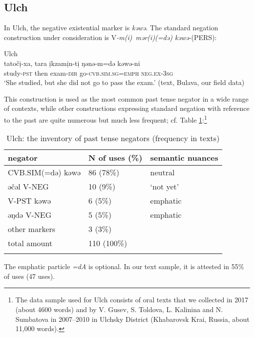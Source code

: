 \documentclass[output=paper]{langscibook}
\begin{document}
\subsection{Ulch}\label{sec:T5.4}

In Ulch, the negative existential marker is \textit{kəwə}. The standard negation construction under consideration is V\textit{-m(i)~mər(i)(=də) kəwə-}(PERS):

\ea Ulch \label{ex:T16}\\
	\gll tatočị-xa,	tara	ịkzamịn-tị	ŋənə-m=də	kəwə-ni\\
	study-\textsc{pst}	then	exam-\textsc{dir}	go-\textsc{cvb.sim.sg=emph}	\textsc{neg.ex-3sg}\\
	\glt `She studied, but she did not go to pass the exam.' (text, Bulava, our field data)
\z

This construction is used as the most common past tense negator in a wide range of contexts, while other constructions expressing standard negation with reference to the past are quite numerous but much less frequent; cf. Table \ref{tab:T5}:\footnote{The data sample used for Ulch consists of oral texts that we collected in 2017 (about 4600 words) and by V. Gusev, S. Toldova, L. Kalinina and N. Sumbatova in 2007–2010 in Ulchsky District (Khabarovsk Krai, Russia, about 11,000 words).}

\begin{table}[!h]
    \caption{Ulch: the inventory of past tense negators (frequency in texts)}
    \label{tab:T5}
    \begin{tabular}{@{}lll@{}}
    \lsptoprule
    negator & N of uses (\%) & semantic nuances \\ \midrule
    \rowcolor[HTML]{EFEFEF} 
    CVB.SIM(=də) kəwə & 86 (78\%) & neutral \\
    əčəl V-NEG & 10 (9\%) & ‘not yet’ \\
    V-PST kəwə & 6 (5\%) & emphatic \\
    əŋdə V-NEG & 5 (5\%) & emphatic \\
    other markers & 3 (3\%) &  \\ \midrule
    total amount & 110 (100\%) &  \\ \lspbottomrule
    \end{tabular}
\end{table}


The emphatic particle \textit{=dA} is optional. In our text sample, it is attested in 55\% of uses (47 uses).
\end{document}
